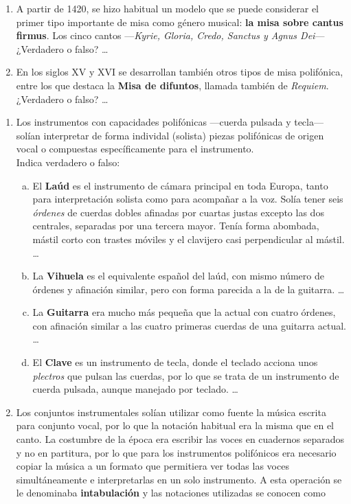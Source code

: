 \documentclass[letterpaper,12pt,notitlepage,spanish]{article}
\begin{document}
%
%
\begin{ejercicio}[]
	\begin{enumerate}[1.-]
%
%
	\item 
	A partir de 1420, se hizo habitual un modelo que se puede considerar el primer tipo importante de misa como género musical: \textbf{la misa sobre cantus firmus}. Los cinco cantos —\textit{Kyrie, Gloria, Credo, Sanctus y Agnus Dei}— 
	¿Verdadero o falso? \ldots
%
%
%
	\item 
	En los siglos XV y XVI se desarrollan también otros tipos de misa polifónica, entre los que destaca la \textbf{Misa de difuntos}, llamada también de \textit{Requiem}. ¿Verdadero o falso? \ldots
	\end{enumerate}
\end{ejercicio}
%
%
\begin{ejercicio}[]
	\begin{enumerate}[1.-]
%
%
	\item 
	Los instrumentos con capacidades polifónicas —cuerda pulsada y tecla— solían interpretar de forma individal (solista) piezas polifónicas de origen vocal o compuestas específicamente para el instrumento. \\Indica verdadero o falso:
		\begin{enumerate}[a)]
			\item El \textbf{Laúd} es el instrumento de cámara principal en toda Europa, tanto para interpretación solista como para acompañar a la voz. Solía tener seis \textit{órdenes} de cuerdas dobles afinadas por cuartas justas excepto las dos centrales, separadas por una tercera mayor. Tenía forma abombada, mástil corto con trastes móviles y el clavijero casi perpendicular al mástil. \ldots
			\item La \textbf{Vihuela} es el equivalente español del laúd, con mismo número de órdenes y afinación similar, pero con forma parecida a la de la guitarra. \ldots
			\item La \textbf{Guitarra} era mucho más pequeña que la actual con cuatro órdenes, con afinación similar a las cuatro primeras cuerdas de una guitarra actual. \ldots
			\item El \textbf{Clave} es un instrumento de tecla, donde el teclado acciona unos \textit{plectros} que pulsan las cuerdas, por lo que se trata de un instrumento de cuerda pulsada, aunque manejado por teclado. \ldots
		\end{enumerate}
%
%
	\item
	Los conjuntos instrumentales solían utilizar como fuente la música escrita para conjunto vocal, por lo que la notación habitual era la misma que en el canto.
	La costumbre de la época era escribir las voces en cuadernos separados y no en partitura, por lo que para los instrumentos polifónicos era necesario copiar la música a un formato que permitiera ver todas las voces simultáneamente e interpretarlas en un solo instrumento. A esta operación se le denominaba \textbf{intabulación} y las notaciones utilizadas se conocen como \dotfill \par


%
	\end{enumerate}
\end{ejercicio}
%
%
\end{document}
